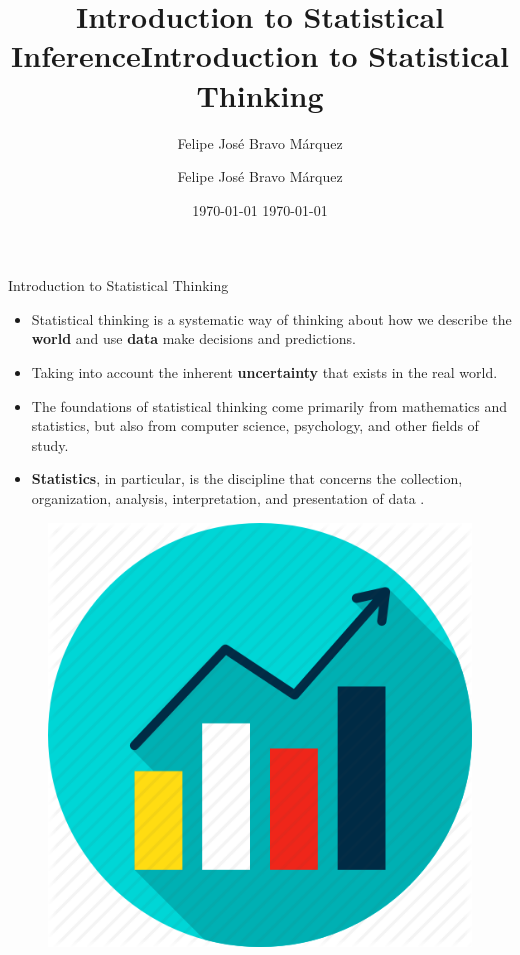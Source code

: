 \documentclass[handout]{beamer}
\title{Introduction to Statistical Inference}
\author[Felipe Bravo Márquez]{\footnotesize
 \textcolor[rgb]{0.00,0.00,1.00}{Felipe José Bravo Márquez}}
\date{ \today }
\title{Introduction to Statistical Thinking}
\author[Felipe Bravo Márquez]{\footnotesize
 \textcolor[rgb]{0.00,0.00,1.00}{Felipe José Bravo Márquez}}
\date{ \today }
\begin{document}
\begin{frame}
\titlepage


\end{frame}




\begin{frame}{Introduction to Statistical Thinking}
\scriptsize{
\begin{itemize}
\item Statistical thinking is a systematic way of thinking about how we describe the \textbf{world} and use \textbf{data} make decisions and predictions.

\item Taking into account the inherent \textbf{uncertainty} that exists in the real world.  \cite{poldrack2019statistical}

 
 \item The foundations of statistical thinking come primarily from mathematics and statistics, but also from computer science, psychology, and other fields of study. \cite{poldrack2019statistical}
 
 \item \textbf{Statistics}, in particular, is the discipline that concerns the collection, organization, analysis, interpretation, and presentation of data \cite{wiki:Statistics}.
 
\end{itemize}

\begin{figure}[h!]
	\centering
	\includegraphics[scale=0.2]{pics/stats.png}
\end{figure}

} 
\end{frame}
\end{document}
